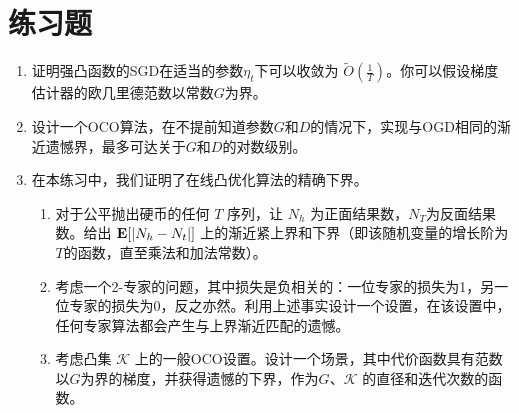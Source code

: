 \newpage
\section{
	练习题}

\begin{enumerate}
\item \label{exercise:fast-rate}
	
证明强凸函数的SGD在适当的参数$\eta_t$下可以收敛为 $\tilde{O}(\frac{1}{T})$。你可以假设梯度估计器的欧几里德范数以常数$G$为界。

\item
设计一个OCO算法，在不提前知道参数$G$和$D$的情况下，实现与OGD相同的渐近遗憾界，最多可达关于$G$和$D$的对数级别。


\item \label{exercise:ogd-lower-bound}
在本练习中，我们证明了在线凸优化算法的精确下界。
\begin{enumerate}
\item
对于公平抛出硬币的任何 $T$ 序列，让 $N_h$ 为正面结果数，$N_T$为反面结果数。给出 $\mathop{\mbox{\bf E}}[ \left| N_h - N_t \right|]$ 上的渐近紧上界和下界（即该随机变量的增长阶为$T$的函数，直至乘法和加法常数）。
\item
考虑一个2-专家的问题，其中损失是负相关的：一位专家的损失为1，另一位专家的损失为0，反之亦然。利用上述事实设计一个设置，在该设置中，任何专家算法都会产生与上界渐近匹配的遗憾。
\item
考虑凸集 $\mathcal{K}$ 上的一般OCO设置。设计一个场景，其中代价函数具有范数以$G$为界的梯度，并获得遗憾的下界，作为$G$、$\mathcal{K}$ 的直径和迭代次数的函数。
\end{enumerate}
	

\end{enumerate}



